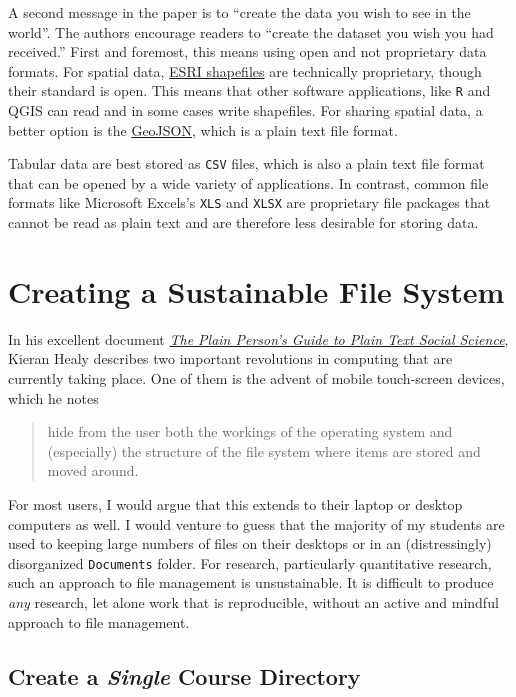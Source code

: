 \documentclass[]{book}
\theoremstyle{definition}
\theoremstyle{definition}
\theoremstyle{definition}
\theoremstyle{remark}
\begin{document}
A second message in the paper is to ``create the data you wish to see in
the world''. The authors encourage readers to ``create the dataset you
wish you had received.'' First and foremost, this means using open and
not proprietary data formats. For spatial data,
\href{https://en.wikipedia.org/wiki/Shapefile}{ESRI shapefiles} are
technically proprietary, though their standard is open. This means that
other software applications, like \texttt{R} and QGIS can read and in
some cases write shapefiles. For sharing spatial data, a better option
is the \href{https://en.wikipedia.org/wiki/GeoJSON}{GeoJSON}, which is a
plain text file format.

Tabular data are best stored as \texttt{CSV} files, which is also a
plain text file format that can be opened by a wide variety of
applications. In contrast, common file formats like Microsoft Excels's
\texttt{XLS} and \texttt{XLSX} are proprietary file packages that cannot
be read as plain text and are therefore less desirable for storing data.

\section{Creating a Sustainable File
System}\label{creating-a-sustainable-file-system}

In his excellent document \href{http://plain-text.co}{\emph{The Plain
Person's Guide to Plain Text Social Science}}, Kieran Healy describes
two important revolutions in computing that are currently taking place.
One of them is the advent of mobile touch-screen devices, which he notes

\begin{quote}
hide from the user both the workings of the operating system and
(especially) the structure of the file system where items are stored and
moved around.
\end{quote}

For most users, I would argue that this extends to their laptop or
desktop computers as well. I would venture to guess that the majority of
my students are used to keeping large numbers of files on their desktops
or in an (distressingly) disorganized \texttt{Documents} folder. For
research, particularly quantitative research, such an approach to file
management is unsustainable. It is difficult to produce \emph{any}
research, let alone work that is reproducible, without an active and
mindful approach to file management.

\subsection{\texorpdfstring{Create a \emph{Single} Course
Directory}{Create a Single Course Directory}}\label{create-a-single-course-directory}
\end{document}
